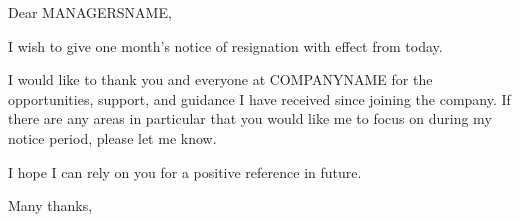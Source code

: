 \documentclass{letter}
\date{\displaydate{date}}
\begin{document}
\begin{letter}{}
\opening{Dear MANAGERSNAME,}

I wish to give one month's notice of resignation with effect from today.

I would like to thank you and everyone at COMPANYNAME for the opportunities,
support, and guidance I have received since joining the company. If there are
any areas in particular that you would like me to focus on during my notice
period, please let me know.

I hope I can rely on you for a positive reference in future.

\closing{Many thanks,}

\end{letter}
\end{document}
